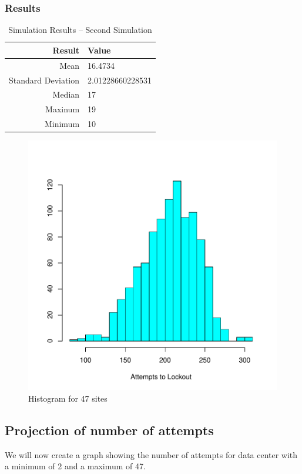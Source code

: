 \documentclass[11pt, letterpaper]{article}
\begin{document}
\subsubsection*{Results}
\begin{table}[H]
	\centering
	\caption{Simulation Results -- Second Simulation}
	\begin{tabular}{||r|l||}
		\hline \hline
		Result                  & Value                     \\ \hline \hline
		Mean                    & 16.4734    \\ \hline
		Standard Deviation      & 2.01228660228531    \\ \hline
		Median                  & 17    \\ \hline
		Maxinum                 & 19    \\ \hline
		Minimum                 & 10    \\ \hline \hline
	\end{tabular}
	\label{tab:Sim2_res}
\end{table}

\begin{figure}[H]
\centering
\includegraphics{Report-005}
	\caption{Histogram for 47 sites}
	\label{fig:hist_2}
\end{figure}

\subsection{Projection of number of attempts}
We will now create a graph showing the number of attempts for data center
with a minimum of 2 and a maximum of 47.
\end{document}
